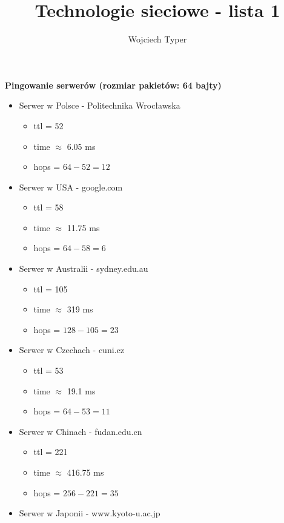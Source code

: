 \documentclass{article}
\title{Technologie sieciowe - lista 1}
\author{Wojciech Typer}
\date{}
\begin{document}
\maketitle
\vspace{1\baselineskip}
\textbf{Pingowanie serwerów (rozmiar pakietów: 64 bajty)}
\vspace{1\baselineskip}
\begin{itemize}
    \item Serwer w Polsce - Politechnika Wrocławska
    \begin{itemize}
        \item ttl = 52
        \item time $\approx$ 6.05 ms 
        \item hops = $64 - 52 = 12$
    \end{itemize}
    \item Serwer w USA - google.com
    \begin{itemize}
        \item ttl = 58
        \item time $\approx$ 11.75 ms
        \item hops = $64 - 58 = 6$
    \end{itemize}
    \item Serwer w Australii - sydney.edu.au
    \begin{itemize}
        \item ttl = 105
        \item time $\approx$ 319 ms
        \item hops = $128 - 105 = 23$
    \end{itemize}
    \item Serwer w Czechach - cuni.cz 
    \begin{itemize}
        \item ttl = 53
        \item time $\approx$ 19.1 ms
        \item hops = $64 - 53 = 11$
    \end{itemize} 
    \item Serwer w Chinach - fudan.edu.cn 
    \begin{itemize}
        \item ttl = 221
        \item time $\approx$ 416.75 ms
        \item hops = $256 - 221 = 35$
    \end{itemize}
    \item Serwer w Japonii - www.kyoto-u.ac.jp
    \begin{itemize}

\end{itemize}
\end{itemize}
\end{document}
